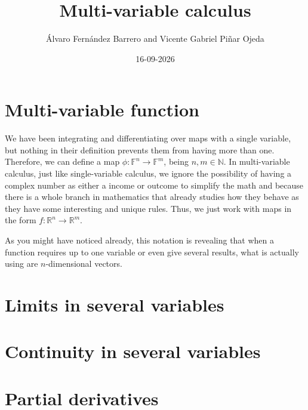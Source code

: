 \documentclass[12pt]{article}
\author{Álvaro Fernández Barrero and Vicente Gabriel Piñar Ojeda}
\title{Multi-variable calculus}
\date{16-09-2026}
\begin{document}
	\maketitle
	
	
	\section{Multi-variable function}
	
	We have been integrating and differentiating over maps with a single variable, but nothing in their definition prevents them from having more than one. Therefore, we can define a map $\phi : \mathbb{F}^n \to \mathbb{F}^m$, being $n, m \in \mathbb{N}$. In multi-variable calculus, just like single-variable calculus, we ignore the possibility of having a complex number as either a income or outcome to simplify the math and because there is a whole branch in mathematics that already studies how they behave as they have some interesting and unique rules. Thus, we just work with maps in the form $f : \mathbb{R}^n \to \mathbb{R}^m$.
	
	As you might have noticed already, this notation is revealing that when a function requires up to one variable or even give several results, what is actually using are $n$-dimensional vectors.
	
	\section{Limits in several variables}
	
	\section{Continuity in several variables}
	
	
	\section{Partial derivatives}
	
\end{document}
